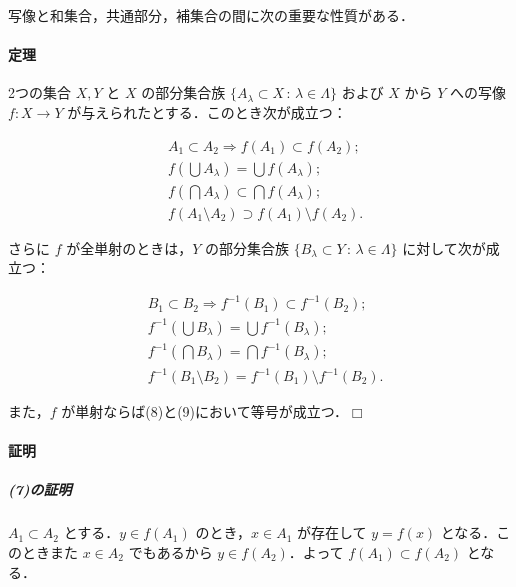 \documentclass[b5paper,pandoc]{bxjsarticle}
\let\oldparagraph\paragraph
\renewcommand{\paragraph}[1]{\oldparagraph{#1}\mbox{}}
\let\oldsubparagraph\subparagraph
\renewcommand{\subparagraph}[1]{\oldsubparagraph{#1}\mbox{}}
\begin{document}
写像と和集合，共通部分，補集合の間に次の重要な性質がある．

\hypertarget{ux5b9aux7406}{%
\paragraph{定理}\label{ux5b9aux7406}}

2つの集合 \(X, Y\) と \(X\) の部分集合族
\(\{A_\lambda \subset X \,:\,\lambda \in \Lambda \}\) および \(X\) から
\(Y\) への写像 \(f \colon X \to Y\)
が与えられたとする．このとき次が成立つ：

\begin{align}
&A_1 \subset A_2 \Longrightarrow f(A_1) \subset f(A_2);\\
&f(\bigcup A_\lambda) = \bigcup f(A_\lambda);\\
&f(\bigcap A_\lambda) \subset \bigcap f(A_\lambda);\\
&f(A_1 \setminus A_2) \supset f(A_1) \setminus f(A_2).
\end{align}

さらに \(f\) が全単射のときは，\(Y\) の部分集合族
\(\{B_\lambda \subset Y \,:\,\lambda \in \Lambda \}\)
に対して次が成立つ：

\begin{align}
&B_1 \subset B_2 \Longrightarrow f^{-1}(B_1) \subset f^{-1}(B_2);\\
&f^{-1}(\bigcup B_\lambda) = \bigcup f^{-1}(B_\lambda);\\
&f^{-1}(\bigcap B_\lambda) = \bigcap f^{-1}(B_\lambda);\\
&f^{-1}(B_1 \setminus B_2) = f^{-1}(B_1) \setminus f^{-1}(B_2).
\end{align}

また，\(f\) が単射ならば(8)と(9)において等号が成立つ．\(\Box\)

\hypertarget{ux8a3cux660e-1}{%
\paragraph{証明}\label{ux8a3cux660e-1}}

\hypertarget{ux306eux8a3cux660e-3}{%
\subparagraph{(7)の証明}\label{ux306eux8a3cux660e-3}}

\(A_1 \subset A_2\) とする．\(y \in f(A_1)\) のとき，\(x \in A_1\)
が存在して \(y = f(x)\) となる．このときまた \(x \in A_2\) でもあるから
\(y \in f(A_2)\)．よって \(f(A_1) \subset f(A_2)\) となる．
\end{document}
